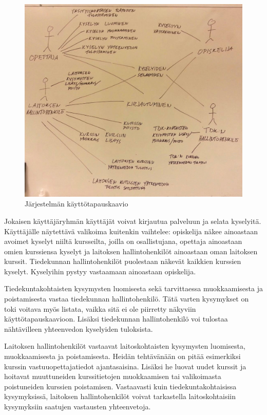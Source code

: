 \documentclass[12pt,a4paper,titlepage]{article}
\begin{document}
\begin{figure}
   \centering
   \includegraphics[width=\textwidth]{kuvat/kayttotapauskaavio.jpg}
   \caption{Järjestelmän käyttötapauskaavio}\label{fig:kayttotapauskaavio}
\end{figure}

Jokaisen käyttäjäryhmän käyttäjät voivat kirjautua palveluun ja selata kyselyitä. Käyttäjälle näytettävä valikoima kuitenkin vaihtelee: opiskelija näkee ainoastaan avoimet kyselyt niiltä kursseilta, joilla on osallistujana, opettaja ainoastaan omien kurssiensa kyselyt ja laitoksen hallintohenkilöt ainoastaan oman laitoksen kurssit. Tiedekunnan hallintohenkilöt puolestaan näkevät kaikkien kurssien kyselyt. Kyselyihin pystyy vastaamaan ainoastaan opiskelija.

Tiedekuntakohtaisten kysymysten luomisesta sekä tarvittaessa muokkaamisesta ja poistamisesta vastaa tiedekunnan hallintohenkilö. Tätä varten kysymykset on toki voitava myös listata, vaikka sitä ei ole piirretty näkyviin käyttötapauskaavioon. Lisäksi tiedekunnan hallintohenkilö voi tulostaa nähtävilleen yhteenvedon kyselyiden tuloksista.

Laitoksen hallintohenkilöt vastaavat laitoskohtaisten kysymysten luomisesta, muokkaamisesta ja poistamisesta. Heidän tehtävänään on pitää esimerkiksi kurssin vastuuopettajatiedot ajantasaisina. Lisäksi he luovat uudet kurssit ja hoitavat muuttuneiden kurssitietojen muokkaamisen tai valikoimasta poistuneiden kurssien poistamisen. Vastaavasti kuin tiedekuntakohtaisissa kysymyksissä, laitoksen hallintohenkilöt voivat tarkastella laitoskohtaisiin kysymyksiin saatujen vastausten yhteenvetoja.
\end{document}
